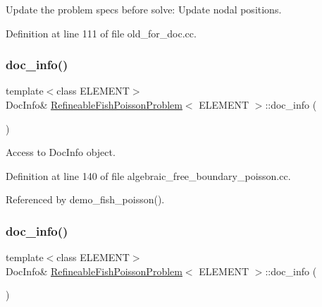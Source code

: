 Update the problem specs before solve\+: Update nodal positions. 



Definition at line 111 of file old\+\_\+for\+\_\+doc.\+cc.

\mbox{\label{classRefineableFishPoissonProblem_a093f5963e63746843c33ca444a205333}} 
\subsubsection{\texorpdfstring{doc\+\_\+info()}{doc\_info()}\hspace{0.1cm}{\footnotesize\ttfamily [1/2]}}
{\footnotesize\ttfamily template$<$class E\+L\+E\+M\+E\+NT$>$ \\
Doc\+Info\& \hyperlink{classRefineableFishPoissonProblem}{Refineable\+Fish\+Poisson\+Problem}$<$ E\+L\+E\+M\+E\+NT $>$\+::doc\+\_\+info (\begin{DoxyParamCaption}{ }\end{DoxyParamCaption})\hspace{0.3cm}{\ttfamily [inline]}}



Access to Doc\+Info object. 



Definition at line 140 of file algebraic\+\_\+free\+\_\+boundary\+\_\+poisson.\+cc.



Referenced by demo\+\_\+fish\+\_\+poisson().

\mbox{\label{classRefineableFishPoissonProblem_a093f5963e63746843c33ca444a205333}} 
\subsubsection{\texorpdfstring{doc\+\_\+info()}{doc\_info()}\hspace{0.1cm}{\footnotesize\ttfamily [2/2]}}
{\footnotesize\ttfamily template$<$class E\+L\+E\+M\+E\+NT$>$ \\
Doc\+Info\& \hyperlink{classRefineableFishPoissonProblem}{Refineable\+Fish\+Poisson\+Problem}$<$ E\+L\+E\+M\+E\+NT $>$\+::doc\+\_\+info (\begin{DoxyParamCaption}{ }\end{DoxyParamCaption})\hspace{0.3cm}{\ttfamily [inline]}}



